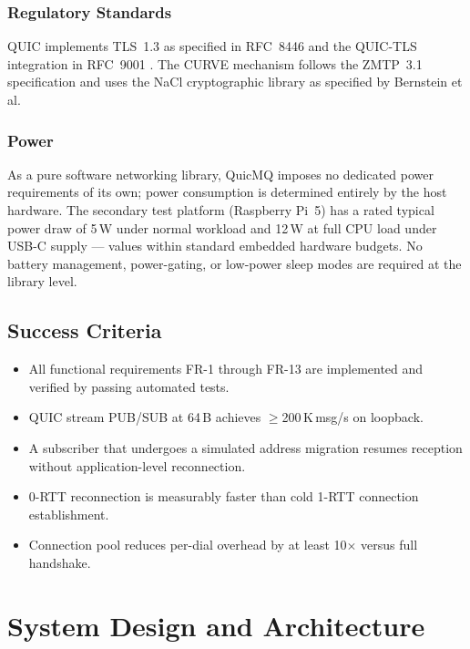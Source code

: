 \documentclass[12pt, a4paper, oneside]{report}
\begin{document}
\subsection{Regulatory Standards}
QUIC implements TLS~1.3 as specified in RFC~8446 \cite{rfc8446} and the QUIC-TLS integration in RFC~9001 \cite{rfc9001}. The CURVE mechanism follows the ZMTP~3.1 specification and uses the NaCl cryptographic library as specified by Bernstein et al.

\subsection{Power}
As a pure software networking library, QuicMQ imposes no dedicated power requirements of its own; power consumption is determined entirely by the host hardware. The secondary test platform (Raspberry Pi~5) has a rated typical power draw of 5\,W under normal workload and 12\,W at full CPU load under USB-C supply — values within standard embedded hardware budgets. No battery management, power-gating, or low-power sleep modes are required at the library level.

\section{Success Criteria}
\label{sec:success}

\begin{itemize}
  \item All functional requirements FR-1 through FR-13 are implemented and verified by passing automated tests.
  \item QUIC stream PUB/SUB at 64\,B achieves $\geq$200\,K\,msg/s on loopback.
  \item A subscriber that undergoes a simulated address migration resumes reception without application-level reconnection.
  \item 0-RTT reconnection is measurably faster than cold 1-RTT connection establishment.
  \item Connection pool reduces per-dial overhead by at least 10$\times$ versus full handshake.
\end{itemize}

\chapter{System Design and Architecture}
\label{ch:design}
\end{document}
